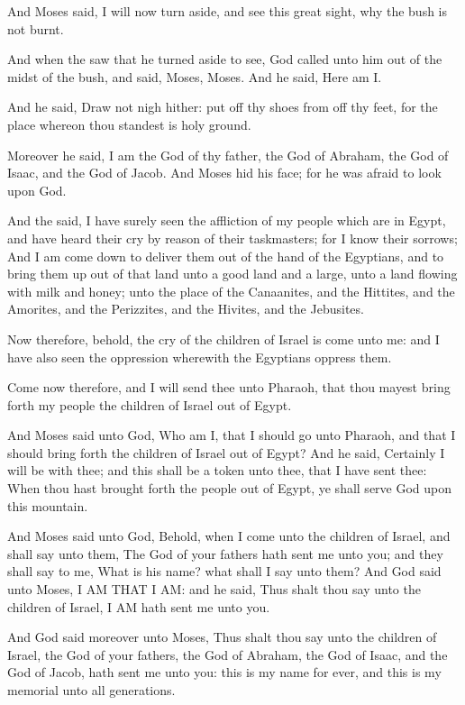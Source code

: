 \Verse And Moses said, I will now turn aside, and see this great sight, why the bush is not burnt.

\Verse And when the \LORD saw that he turned aside to see, God called unto him out of the midst of the bush, and said, Moses, Moses. And he said, Here am I.

\Verse And he said, Draw not nigh hither: put off thy shoes from off thy feet, for the place whereon thou standest is holy ground.

\Verse Moreover he said, I am the God of thy father, the God of Abraham, the God of Isaac, and the God of Jacob. And Moses hid his face; for he was afraid to look upon God.

\Verse And the \LORD said, I have surely seen the affliction of my people which are in Egypt, and have heard their cry by reason of their taskmasters; for I know their sorrows; \Verse And I am come down to deliver them out of the hand of the Egyptians, and to bring them up out of that land unto a good land and a large, unto a land flowing with milk and honey; unto the place of the Canaanites, and the Hittites, and the Amorites, and the Perizzites, and the Hivites, and the Jebusites.

\Verse Now therefore, behold, the cry of the children of Israel is come unto me: and I have also seen the oppression wherewith the Egyptians oppress them.

\Verse Come now therefore, and I will send thee unto Pharaoh, that thou mayest bring forth my people the children of Israel out of Egypt.

\Verse And Moses said unto God, Who am I, that I should go unto Pharaoh, and that I should bring forth the children of Israel out of Egypt?  \Verse And he said, Certainly I will be with thee; and this shall be a token unto thee, that I have sent thee: When thou hast brought forth the people out of Egypt, ye shall serve God upon this mountain.

\Verse And Moses said unto God, Behold, when I come unto the children of Israel, and shall say unto them, The God of your fathers hath sent me unto you; and they shall say to me, What is his name? what shall I say unto them?  \Verse And God said unto Moses, I AM THAT I AM: and he said, Thus shalt thou say unto the children of Israel, I AM hath sent me unto you.

\Verse And God said moreover unto Moses, Thus shalt thou say unto the children of Israel, the \LORD God of your fathers, the God of Abraham, the God of Isaac, and the God of Jacob, hath sent me unto you: this is my name for ever, and this is my memorial unto all generations.

